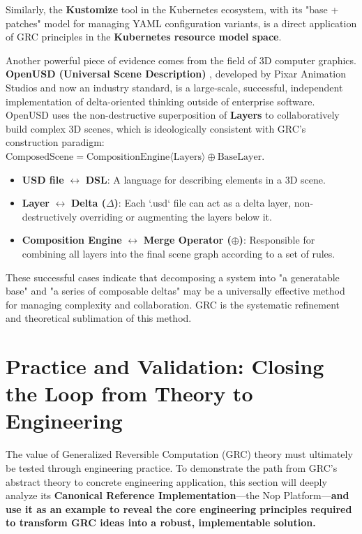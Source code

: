 \documentclass[11pt]{article}
\begin{document}
Similarly, the \textbf{Kustomize} tool in the Kubernetes ecosystem, with its "base + patches" model for managing YAML configuration variants, is a direct application of GRC principles in the \textbf{Kubernetes resource model space}.

Another powerful piece of evidence comes from the field of 3D computer graphics. \textbf{OpenUSD (Universal Scene Description)} \cite{pixar2016}, developed by Pixar Animation Studios and now an industry standard, is a large-scale, successful, independent implementation of delta-oriented thinking outside of enterprise software. OpenUSD uses the non-destructive superposition of \textbf{Layers} to collaboratively build complex 3D scenes, which is ideologically consistent with GRC's construction paradigm: $\text{ComposedScene} = \text{CompositionEngine}\langle\text{Layers}\rangle \oplus \text{BaseLayer}$.

\begin{itemize}
    \item \textbf{USD file} $\leftrightarrow$ \textbf{DSL}: A language for describing elements in a 3D scene.
    \item \textbf{Layer} $\leftrightarrow$ \textbf{Delta ($\Delta$)}: Each `.usd` file can act as a delta layer, non-destructively overriding or augmenting the layers below it.
    \item \textbf{Composition Engine} $\leftrightarrow$ \textbf{Merge Operator ($\oplus$)}: Responsible for combining all layers into the final scene graph according to a set of rules.
\end{itemize}

These successful cases indicate that decomposing a system into "a generatable base" and "a series of composable deltas" may be a universally effective method for managing complexity and collaboration. GRC is the systematic refinement and theoretical sublimation of this method.

\section{Practice and Validation: Closing the Loop from Theory to Engineering}

The value of Generalized Reversible Computation (GRC) theory must ultimately be tested through engineering practice. To demonstrate the path from GRC's abstract theory to concrete engineering application, this section will deeply analyze its \textbf{Canonical Reference Implementation}---the Nop Platform\footnotemark[1]---\textbf{and use it as an example to reveal the core engineering principles required to transform GRC ideas into a robust, implementable solution.}
\end{document}
